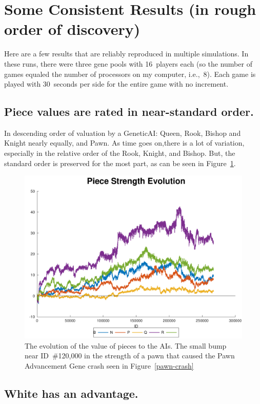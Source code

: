 \documentclass[letterpaper]{article}
\renewcommand{\_}{\allowbreak\textunderscore\allowbreak}
\begin{document}
\section{Some Consistent Results (in rough order of discovery)}

Here are a few results that are reliably reproduced in multiple simulations. In these runs, there were three gene pools with 16~players each (so the number of games equaled the number of processors on my computer, i.e.,~8). Each game is played with 30~seconds per side for the entire game with no increment.

\subsection{Piece values are rated in near-standard order.}
In descending order of valuation by a Genetic\_AI: Queen, Rook, Bishop and Knight nearly equally, and Pawn. As time goes on,there is a lot of variation, especially in the relative order of the Rook, Knight, and Bishop. But, the standard order is preserved for the most part, as can be seen in Figure~\ref{piece-value-plot}.
\begin{figure}[htb]
	\centering
	\includegraphics[width=\textwidth]{pawn-crash-strength-plot}
	\caption{The evolution of the value of pieces to the AIs. The small bump near ID~\#120,000 in the strength of a pawn that caused the Pawn Advancement Gene crash seen in Figure~\ref{pawn-crash}}
	\label{piece-value-plot}
\end{figure}

\subsection{White has an advantage.}
\end{document}
